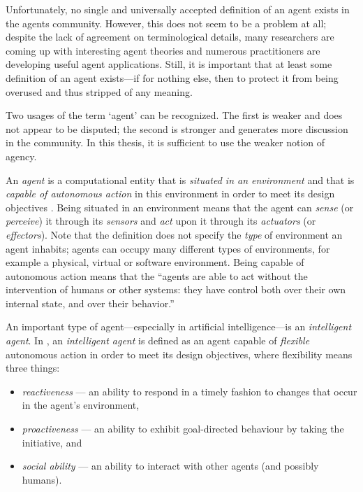 Unfortunately, no single and universally accepted definition of an agent exists in the agents community.
However, this does not seem to be a problem at all; despite the lack of agreement on terminological details, many researchers are coming up with interesting agent theories and numerous practitioners are developing useful agent applications.
Still, it is important that at least some definition of an agent exists---if for nothing else, then to protect it from being overused and thus stripped of any meaning.

Two usages of the term `agent' can be recognized.
The first is weaker and does not appear to be disputed; the second is stronger and generates more discussion in the community.
In this thesis, it is sufficient to use the weaker notion of agency.

An \textit{agent} is a computational entity that is \textit{situated in an environment} and that is \textit{capable of autonomous action} in this environment in order to meet its design objectives \cite{Wooldridge02}.
Being situated in an environment means that the agent can \textit{sense} (or \textit{perceive}) it through its \textit{sensors} and \textit{act} upon it through its \textit{actuators} (or \textit{effectors}).
Note that the definition does not specify the \textit{type} of environment an agent inhabits; agents can occupy many different types of environments, for example a physical, virtual or software environment.
Being capable of autonomous action means that the ``agents are able to act without the intervention of humans or other systems: they have control both over their own internal state, and over their behavior.'' \cite{Wooldridge02}

An important type of agent---especially in artificial intelligence---is an \textit{intelligent agent}.
In \cite{Wooldridge02}, an \textit{intelligent agent} is defined as an agent capable of \textit{flexible} autonomous action in order to meet its design objectives, where flexibility means three things:
\begin{itemize} %
	\item \textit{reactiveness} --- an ability to respond in a timely fashion to changes that occur in the agent's environment,
	\item \textit{proactiveness} --- an ability to exhibit goal-directed behaviour by taking the initiative, and
	\item \textit{social ability} --- an ability to interact with other agents (and possibly humans).
\end{itemize}

